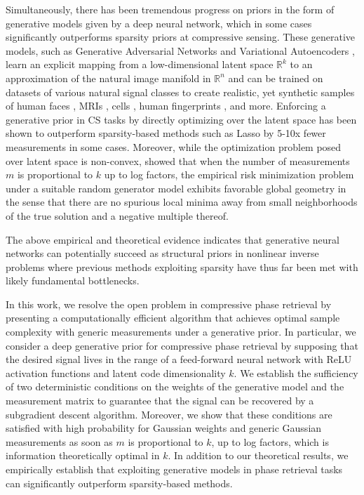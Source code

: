 \documentclass[11pt]{article}
\newcommand{\R}{\mathbb{R}}
\theoremstyle{remark}
\begin{document}
Simultaneously, there has been tremendous progress on priors in the form of generative models given by a deep neural network, which in some cases significantly outperforms sparsity priors at compressive sensing. These generative models, such as Generative Adversarial Networks \cite{Goodfellow2014} and Variational Autoencoders \cite{Kingma2014}, learn an explicit mapping from a low-dimensional latent space $\R^k$ to an approximation of the natural image manifold in $\R^n$ and can be trained on datasets of various natural signal classes to create  realistic, yet synthetic samples of human faces \cite{Karras2019}, MRIs \cite{MRI_GAN}, cells \cite{Cell_GAN}, human fingerprints \cite{FingerGAN}, and more. Enforcing a generative prior in CS tasks by directly optimizing over the latent space has been shown to outperform sparsity-based methods such as Lasso by 5-10x fewer measurements \cite{Price2017} in some cases. Moreover, while the optimization problem posed over latent space is non-convex, \cite{HV2017} showed that when the number of measurements $m$ is proportional to $k$ up to log factors, the empirical risk minimization problem under a suitable random generator model exhibits favorable global geometry in the sense that there are no spurious local minima away from small neighborhoods of the true solution and a negative multiple thereof. %

The above empirical and theoretical evidence indicates that generative neural networks can potentially succeed as structural priors in nonlinear inverse problems where previous methods exploiting sparsity have thus far been met with likely fundamental bottlenecks.


In this work, we resolve the open problem in compressive phase retrieval by presenting a computationally efficient algorithm that achieves optimal sample complexity with generic measurements under a generative prior. In particular, we consider a deep generative prior for compressive phase retrieval by supposing that the desired signal lives in the range of a feed-forward neural network with ReLU activation functions and latent code dimensionality $k$. We establish the sufficiency of two deterministic conditions on the weights of the generative model and the measurement matrix to guarantee that the signal can be recovered by a subgradient descent algorithm. Moreover, we show that these conditions are satisfied with high probability for Gaussian weights and generic Gaussian measurements as soon as $m$ is proportional to $k$, up to log factors, which is information theoretically optimal in $k$. In addition to our theoretical results, we empirically establish that exploiting generative models in phase retrieval tasks can significantly outperform sparsity-based methods.
\end{document}
